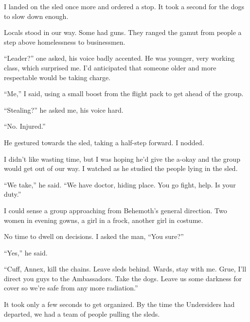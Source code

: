 I landed on the sled once more and ordered a stop.  It took a second for the dogs to slow down enough.



Locals stood in our way.  Some had guns.  They ranged the gamut from people a step above homelessness to businessmen.



``Leader?'' one asked, his voice badly accented.  He was younger, very working class, which surprised me.  I'd anticipated that someone older and more respectable would be taking charge.



``Me,'' I said, using a small boost from the flight pack to get ahead of the group.



``Stealing?'' he asked me, his voice hard.



``No.  Injured.''



He gestured towards the sled, taking a half-step forward.  I nodded.



I didn't like wasting time, but I was hoping he'd give the a-okay and the group would get out of our way.  I watched as he studied the people lying in the sled.



``We take,'' he said.  ``We have doctor, hiding place.  You go fight, help.  Is your duty.''



I could sense a group approaching from Behemoth's general direction.  Two women in evening gowns, a girl in a frock, another girl in costume.



No time to dwell on decisions.  I asked the man, ``You sure?''



``Yes,'' he said.



``Cuff, Annex, kill the chains.  Leave sleds behind.  Wards, stay with me.  Grue, I'll direct you guys to the Ambassadors.  Take the dogs.  Leave us some darkness for cover so we're safe from any more radiation.''



It took only a few seconds to get organized.  By the time the Undersiders had departed, we had a team of people pulling the sleds.



